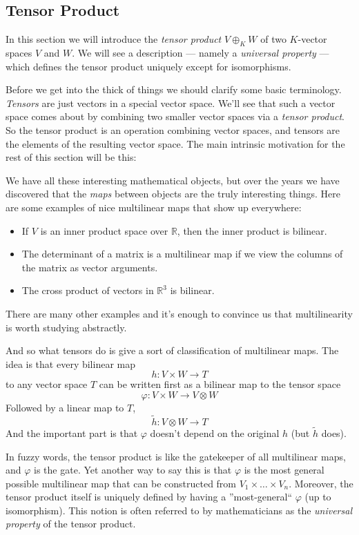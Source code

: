 \subsection{Tensor Product}
In this section we will introduce the \emph{tensor product} \(V \oplus_K W\) of two \(K\)-vector spaces \(V\) and \(W\).
We will see a description --- namely a \emph{universal property} --- which defines the tensor product uniquely except for isomorphisms.

Before we get into the thick of things we should clarify some basic terminology.
\emph{Tensors} are just vectors in a special vector space.
We’ll see that such a vector space comes about by combining two smaller vector spaces via a \emph{tensor product}.
So the tensor product is an operation combining vector spaces, and tensors are the elements of the resulting vector space.
The main intrinsic motivation for the rest of this section will be this:

We have all these interesting mathematical objects, but over the years we have discovered that the \emph{maps} between objects are the truly interesting things.
Here are some examples of nice multilinear maps that show up everywhere:
\begin{itemize}
   \item If \(V\) is an inner product space over \(\mathbb{R}\), then the inner product is bilinear.
   \item The determinant of a matrix is a multilinear map if we view the columns of the matrix as vector arguments.
   \item The cross product of vectors in \(\mathbb{R}^3\) is bilinear.
\end{itemize}
There are many other examples and it’s enough to convince us that multilinearity is worth studying abstractly.

And so what tensors do is give a sort of classification of multilinear maps.
The idea is that every bilinear map
\[h: V \times W \to T\]
to any vector space \(T\) can be written first as a bilinear map to the tensor space
\[\varphi: V \times W \to V \otimes W\]
Followed by a linear map to \(T\),
\[\tilde{h} : V \otimes W \to T\]
And the important part is that \(\varphi\) doesn’t depend on the original \(h\) (but \(\tilde{h}\) does).

In fuzzy words, the tensor product is like the gatekeeper of all multilinear maps, and \(\varphi\) is the gate.
Yet another way to say this is that \(\varphi\) is the most general possible multilinear map that can be constructed from \(V_1 \times \dots \times V_n\).
Moreover, the tensor product itself is uniquely defined by having a ''most-general`` \(\varphi\) (up to isomorphism).
This notion is often referred to by mathematicians as the \emph{universal property} of the tensor product.


